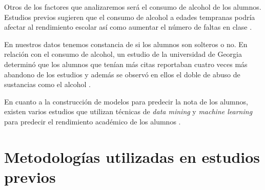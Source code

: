 Otros de los factores que analizaremos será el consumo de alcohol de los alumnos. Estudios previos sugieren que el consumo de alcohol a edades tempranas podría afectar al rendimiento escolar así como aumentar el número de faltas en clase \cite{wagner2007alcohol} \cite{kovacs2008relacion}.

En nuestros datos tenemos constancia de si los alumnos son solteros o no. En relación con el consumo de alcohol, un estudio de la universidad de Georgia determinó que los alumnos que tenían más citas reportaban cuatro veces más abandono de los estudios y además se observó en ellos el doble de abuso de sustancias como el alcohol \cite{orpinas2013dating}.

En cuanto a la construcción de modelos para predecir la nota de los alumnos, existen varios estudios que utilizan técnicas de \textit{data mining} y \textit{machine learning} para predecir el rendimiento académico de los alumnos \cite{mengash2020using} \cite{cortez2008using}.

\section{Metodologías utilizadas en estudios previos}
